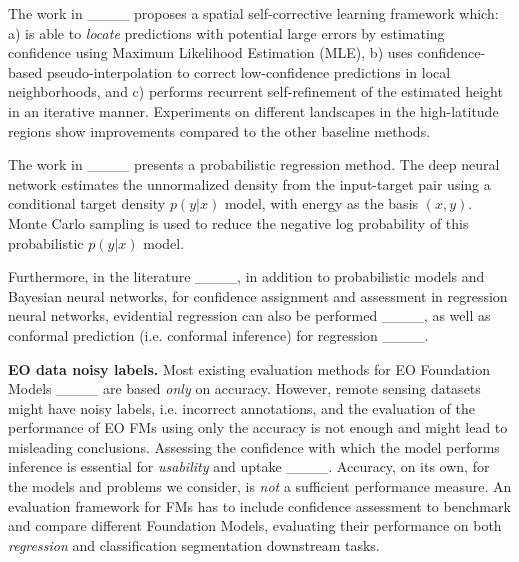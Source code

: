 The work in ____ proposes a spatial self-corrective learning framework which: a) is able to \textit{locate}     predictions with potential large errors by estimating confidence using Maximum Likelihood Estimation (MLE), b) uses confidence-based pseudo-interpolation to correct low-confidence predictions in local neighborhoods, and c) performs recurrent self-refinement of the estimated height in an iterative manner.
Experiments on different landscapes in the high-latitude regions show improvements compared to the other baseline methods.


The work in ____ 
presents a probabilistic regression method. 
The deep neural network estimates the unnormalized density from the input-target pair using a conditional target density $p(y|x)$ model, with energy as the basis $(x, y)$. 
Monte Carlo sampling is used to reduce the negative log probability of this probabilistic $p(y|x)$ model. 



Furthermore, in the literature ____, in addition to probabilistic models and Bayesian neural networks, for confidence assignment and assessment in regression neural networks, evidential regression can also be performed ____, as well as conformal prediction (i.e. conformal inference) for regression ____.



\textbf{EO data noisy labels.}        
Most existing evaluation methods for EO Foundation Models ____ are based \textit{only} on accuracy.              
However, remote sensing datasets might have noisy labels,  
i.e. incorrect annotations,   
and the evaluation of the performance of EO FMs using only the accuracy  
is not enough and might lead to misleading conclusions.   
Assessing the confidence with which the model performs inference is essential for \textit{usability} and uptake ____.       
Accuracy, on its own, for the models and problems we consider, is \textit{not} a sufficient performance measure.            
An evaluation framework for FMs has to include confidence assessment to benchmark and compare different Foundation Models, evaluating their performance on both \textit{regression} and classification segmentation downstream tasks.  



